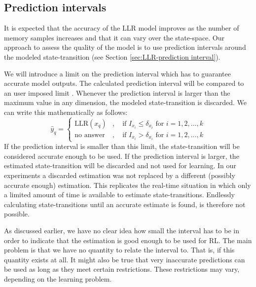 \subsection{Prediction intervals} \label{sec:PS-Prediction intervals}
It is expected that the accuracy of the \ac{LLR} model improves as the number of memory samples increases and that it can vary over the state-space. Our approach to assess the quality of the model is to use prediction intervals around the modeled state-transition (see Section \ref{sec:LLR-prediction interval}). 

We will introduce a limit on the prediction interval which has to guarantee accurate model outputs. The calculated prediction interval  will be compared to an user imposed limit . Whenever the prediction interval is larger than the maximum value in any dimension, the modeled state-transition is discarded. We can write this mathematically as follows:
$$
	\hat{y}_q = 
	 	 \left\{\begin{array}{ll}
		 	\textrm{LLR}(x_q)  &, \quad \textrm{if $I_{x_i} \leq \delta_{x_i}$ for $i=1,2,\hdots,k$} \\
		 	\textrm{no answer} &, \quad \textrm{if $I_{x_i} > \delta_{x_i}$ for $i=1,2,\hdots,k$}  
		 \end{array}\right.
$$
If the prediction interval is smaller than this limit, the state-transition will be considered accurate enough to be used. If the prediction interval is larger, the estimated state-transition will be discarded and not used for learning. In our experiments a discarded estimation was not replaced by a different (possibly accurate enough) estimation. This replicates the real-time situation in which only a limited amount of time is available to estimate state-transitions. Endlessly calculating state-transitions until an accurate estimate is found, is therefore not possible.

As discussed earlier, we have no clear idea how small the interval has to be in order to indicate that the estimation is good enough to be used for \ac{RL}. The main problem is that we have no quantity to relate the interval to. That is, if this quantity exists at all. It might also be true that very inaccurate predictions can be used as long as they meet certain restrictions. These restrictions may vary, depending on the learning problem.

